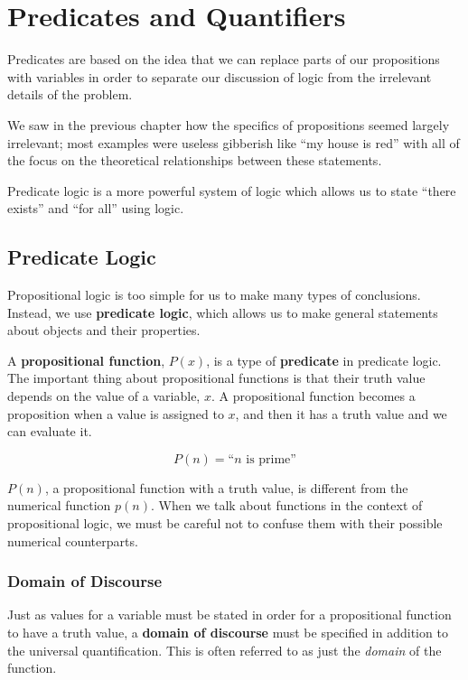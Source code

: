 \chapter{Predicates and Quantifiers}
\label{ch:predicates}
Predicates are based on the idea that we can replace parts of our propositions with variables in order to separate our discussion of logic from the irrelevant details of the problem.

We saw in the previous chapter how the specifics of propositions seemed largely irrelevant; most examples were useless gibberish like ``my house is red'' with all of the focus on the theoretical relationships between these statements.

Predicate logic is a more powerful system of logic which allows us to state ``there exists'' and ``for all'' using logic.


\section{Predicate Logic}

Propositional logic is too simple for us to make many types of conclusions.
Instead, we use \textbf{predicate logic}, which allows us to make general
statements about objects and their properties.

A \textbf{propositional function}, $P(x)$, is a
type of \textbf{predicate} in
predicate logic. The important thing about propositional functions is that their truth value depends on the value of a variable, $x$.
A propositional function becomes a proposition when a value is assigned to $x$, and then it has a truth value and we can evaluate it.
\begin{ex}
  \[ P(n)=\text{``$n$ is prime''} \]
  \begin{remark}
    $P(n)$, a propositional function with a truth value, is different from the numerical function $p(n)$.
    When we talk about functions in the context of propositional logic, we must be careful not to confuse them with their possible numerical counterparts.
  \end{remark}
\end{ex}


\subsection{Domain of Discourse}
Just as values for a variable must be stated in order for a propositional function to have a truth value, a \textbf{domain of discourse} must be specified in addition to the universal quantification.
This is often referred to as just the \emph{domain} of the function.


